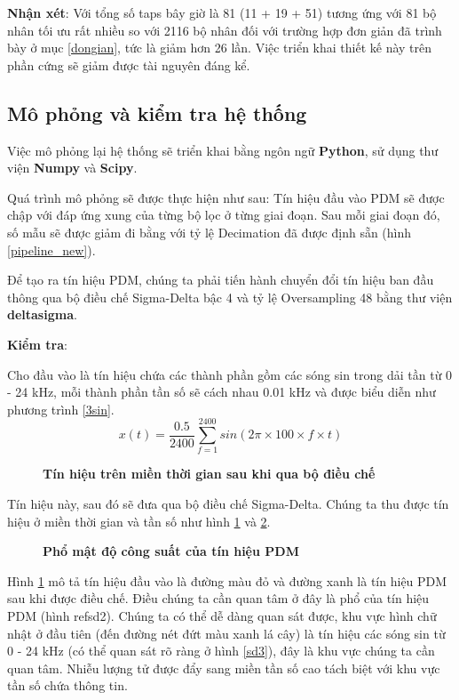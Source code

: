\noindent \textbf{Nhận xét}: Với tổng số taps bây giờ là 81 (11 + 19 + 51) tương ứng với 81 bộ nhân tối ưu rất nhiều so với 2116 bộ nhân đối với trường hợp đơn giản đã trình bày ở mục \ref{dongian}, tức là giảm hơn 26 lần.
Việc triển khai thiết kế này trên phần cứng sẽ giảm được tài nguyên đáng kể.
\subsection{Mô phỏng và kiểm tra hệ thống}
Việc mô phỏng lại hệ thống sẽ triển khai bằng ngôn ngữ \textbf{Python}, sử dụng thư viện \textbf{Numpy} và \textbf{Scipy}.

Quá trình mô phỏng sẽ được thực hiện như sau: Tín hiệu đầu vào PDM sẽ được chập với đáp ứng xung của từng bộ lọc ở từng giai đoạn. Sau mỗi giai đoạn đó, số mẫu sẽ được giảm đi bằng với tỷ lệ Decimation đã được định sẵn (hình \ref{pipeline_new}).

Để tạo ra tín hiệu PDM, chúng ta phải tiến hành chuyển đổi tín hiệu ban đầu thông qua bộ điều chế Sigma-Delta bậc 4 và tỷ lệ Oversampling 48 bằng thư viện \textbf{deltasigma}.

\textbf{Kiểm tra}:

Cho đầu vào là tín hiệu chứa các thành phần gồm các sóng sin trong dải tần từ 0 - 24 kHz, mỗi thành phần tần số sẽ cách nhau 0.01 kHz và được biểu diễn như phương trình \ref{3sin}.
\begin{equation} \label{3sin}
    x(t) = \frac{0.5}{2400}\sum^{2400}_{f = 1}sin(2\pi \times 100 \times f \times t)
\end{equation}


\begin{figure}[H]
    \centering
    
    \caption[Tín hiệu trên miền thời gian sau khi qua bộ điều chế]{\bfseries \fontsize{12pt}{0pt}\selectfont Tín hiệu trên miền thời gian sau khi qua bộ điều chế}
    \label{sd1}
\end{figure}
Tín hiệu này, sau đó sẽ đưa qua bộ điều chế Sigma-Delta. Chúng ta thu được tín hiệu ở miền thời gian và tần số như hình \ref{sd1} và \ref{sd2}.
\begin{figure}[H]
    \centering
    
    \caption[Phổ mật độ công suất của tín hiệu PDM]{\bfseries \fontsize{12pt}{0pt}\selectfont Phổ mật độ công suất của tín hiệu PDM}
    \label{sd2}
\end{figure}

Hình \ref{sd1} mô tả tín hiệu đầu vào là đường màu đỏ và đường xanh là tín hiệu PDM sau khi được điều chế. Điều chúng ta cần quan tâm ở đây là phổ của tín hiệu PDM (hình ref{sd2}). Chúng ta có thể dễ dàng quan sát được, khu vực hình chữ nhật ở đầu tiên (đến đường nét đứt màu xanh lá cây) là tín hiệu các sóng sin từ 0 - 24 kHz  (có thể quan sát rõ ràng ở hình \ref{sd3}), đây là khu vực chúng ta cần quan tâm. Nhiễu lượng tử được đẩy sang miền tần số cao tách biệt với khu vực tần số chứa thông tin.

